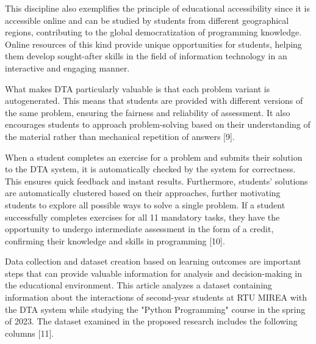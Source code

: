 \documentclass[letterpaper]{article}
\begin{document}
\begin{multicols}{2}
\begin{justify}
      This discipline also exemplifies the principle of educational accessibility since it is accessible online and can be studied by students from different geographical regions, contributing to the global democratization of programming knowledge. Online resources of this kind provide unique opportunities for students, helping them develop sought-after skills in the field of information technology in an interactive and engaging manner.

      What makes DTA particularly valuable is that each problem variant is autogenerated. This means that students are provided with different versions of the same problem, ensuring the fairness and reliability of assessment. It also encourages students to approach problem-solving based on their understanding of the material rather than mechanical repetition of answers [9].

      When a student completes an exercise for a problem and submits their solution to the DTA system, it is automatically checked by the system for correctness. This ensures quick feedback and instant results. Furthermore, students' solutions are automatically clustered based on their approaches, further motivating students to explore all possible ways to solve a single problem. If a student successfully completes exercises for all 11 mandatory tasks, they have the opportunity to undergo intermediate assessment in the form of a credit, confirming their knowledge and skills in programming [10].

      Data collection and dataset creation based on learning outcomes are important steps that can provide valuable information for analysis and decision-making in the educational environment. This article analyzes a dataset containing information about the interactions of second-year students at RTU MIREA with the DTA system while studying the "Python Programming" course in the spring of 2023. The dataset examined in the proposed research includes the following columns [11].


\end{justify}
\end{multicols}
\end{document}
